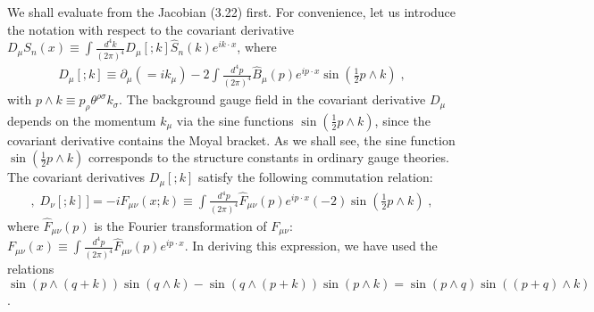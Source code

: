 \documentclass[a4paper,12pt]{article}
\begin{document}
We shall evaluate from the Jacobian (3.22) first. For convenience, let us 
introduce the notation with respect to the covariant derivative 
$D_{\mu}S_{n}(x) 
\equiv \int\frac{d^{4}k}{(2\pi)^{4}}D_{\mu}[;k]\hat{S}_{n}(k)
e^{ik \cdot x}$, where 
%
%
\begin{eqnarray}
D_{\mu}[;k]
\equiv  \partial_{\mu}(=ik_{\mu}) - 2\int\frac{d^{4}p}{(2\pi)^{4}} 
\hat{B}_{\mu}(p)e^{ip \cdot x} 
\sin\left( \frac{1}{2}p \wedge k \right)  \;,
\end{eqnarray}
%
with $p \wedge k \equiv p_{\rho}\theta^{\rho\sigma}k_{\sigma}$. 
The background gauge field in the covariant derivative $D_{\mu}$ 
depends on the momentum $k_{\mu}$ via the sine functions 
$\sin\left( \frac{1}{2}p \wedge k \right)$, since the covariant 
derivative contains the Moyal bracket. As we shall see, the sine function 
$\sin\left( \frac{1}{2}p \wedge k \right)$ corresponds to 
the structure constants in ordinary gauge theories. 
The covariant derivatives 
$D_{\mu}[;k]$ satisfy the following commutation relation: 
%
\begin{eqnarray}
[\, D_{\mu}[;k], \; D_{\nu}[;k] \,] = -iF_{\mu\nu}(x; k) \equiv 
\int \frac{d^{4}p}{(2\pi)^{4}} \hat{F}_{\mu\nu}(p)e^{ip \cdot x} 
(-2)\sin \left( \frac{1}{2}p \wedge k \right) \;, 
\end{eqnarray}
%
where $\hat{F}_{\mu\nu}(p)$ is the Fourier transformation of $F_{\mu\nu}$: 
$F_{\mu\nu}(x) \equiv \int \frac{d^{4}p}{(2\pi)^{4}} 
\hat{F}_{\mu\nu}(p)e^{ip \cdot x}$. In deriving this expression, we have 
used the relations \\
$\sin\left(p \wedge (q+k) \right)  
\sin\left(q \wedge k \right)  
 - \sin\left(q \wedge (p+k) \right)  
 \sin\left(p \wedge k \right)  
= \sin\left(p \wedge q \right)  
\sin\left( (p+q) \wedge k \right)$. 
\end{document}
